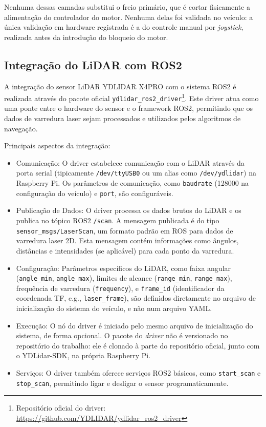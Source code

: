 Nenhuma dessas camadas substitui o freio primário, que é cortar fisicamente a
alimentação do controlador do motor. Nenhuma delas foi validada no veículo: a
única validação em hardware registrada é a do controle manual por
\textit{joystick}, realizada antes da introdução do bloqueio do motor.

\subsection{Integração do LiDAR com ROS2}

A integração do sensor LiDAR YDLIDAR X4PRO com o sistema ROS2 é realizada
através do pacote oficial \texttt{ydlidar\_ros2\_driver}\footnote{Repositório
      oficial do driver:
      \url{https://github.com/YDLIDAR/ydlidar_ros2_driver}}\cite{YDLIDARDriver}. Este
driver atua como uma ponte entre o hardware do sensor e o framework ROS2,
permitindo que os dados de varredura laser sejam processados e utilizados pelos
algoritmos de navegação.

Principais aspectos da integração:
\begin{itemize}
      \item Comunicação: O driver estabelece comunicação com o LiDAR através da porta
            serial (tipicamente \texttt{/dev/ttyUSB0} ou um alias como
            \texttt{/dev/ydlidar}) na Raspberry Pi. Os parâmetros de comunicação, como
            \texttt{baudrate} (128000 na configuração do veículo) e \texttt{port}, são configuráveis.
      \item Publicação de Dados: O driver processa os dados brutos do LiDAR e os publica no
            tópico ROS2 \texttt{/scan}. A mensagem publicada é do tipo
            \texttt{sensor\_msgs/LaserScan}, um formato padrão em ROS para dados de
            varredura laser 2D. Esta mensagem contém informações como ângulos, distâncias e
            intensidades (se aplicável) para cada ponto da varredura.
      \item Configuração: Parâmetros específicos do LiDAR, como faixa angular
            (\texttt{angle\_min}, \texttt{angle\_max}), limites de alcance
            (\texttt{range\_min}, \texttt{range\_max}), frequência de varredura
            (\texttt{frequency}), e \texttt{frame\_id} (identificador da coordenada TF,
            e.g., \texttt{laser\_frame}), são definidos diretamente no arquivo de
            inicialização do sistema do veículo, e não num arquivo YAML.
      \item Execução: O nó do driver é iniciado pelo mesmo arquivo de
            inicialização do sistema, de forma opcional. O pacote do
            \textit{driver} não é versionado no repositório do trabalho: ele é
            clonado à parte do repositório oficial, junto com o YDLidar-SDK, na
            própria Raspberry Pi.
      \item Serviços: O driver também oferece serviços ROS2 básicos, como
            \texttt{start\_scan} e \texttt{stop\_scan}, permitindo ligar e desligar o
            sensor programaticamente.
\end{itemize}

